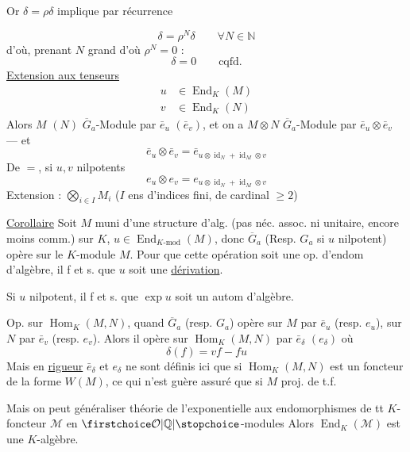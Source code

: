 Or $\delta=\rho\delta$ implique par récurrence

\[
\delta=\rho^N\delta\qquad\forall N\in\mathbb{N}
\]
d'où, prenant $N$ grand d'où $\rho^N=0$ :
\[
\delta=0\qquad\text{cqfd.}
\]
\uline{Extension aux tenseurs}
\[
\begin{aligned}
u&\in\operatorname{End}_K(M)\\
v&\in\operatorname{End}_K(N)
\end{aligned}
\]
Alors $M$ $(N)$ $\overline G_a$-Module par $\bar e_u$ $(\bar e_v)$, et on a $M\otimes N$ $\overline G_a$-Module par $\bar e_u\otimes\bar e_v$ --- et
\[
\bar e_u\otimes\bar e_v=\bar e_{u\otimes\operatorname{id}_N+\operatorname{id}_M\otimes v}
\]
De $=$, si $u,v$ nilpotents
\[
e_u\otimes e_v=e_{u\otimes\operatorname{id}_N+\operatorname{id}_M\otimes v}
\]
Extension : $\displaystyle\bigotimes_{i\in I}M_i$ ($I$ ens d'indices fini, de cardinal $\geq2$)

\uline{Corollaire} Soit $M$ muni d'une structure d'alg. (pas néc. assoc. ni unitaire, encore moins comm.) sur $K$, $u\in\operatorname{End}_{K\text{-mod}}(M)$, donc $\overline G_a$ (Resp. $G_a$ si $u$ nilpotent) opère sur le $K$-module $M$. Pour que cette opération soit une op. d'endom d'algèbre, il f et s. que $u$ soit une \uline{dérivation}.

Si $u$ nilpotent, il f et s. que $\exp u$ soit un autom d'algèbre.

Op. sur $\operatorname{Hom}_K(M,N)$, quand $\overline G_a$ (resp. $G_a$) opère sur $M$ par $\bar e_u$ (resp. $e_u$), sur $N$ par $\bar e_v$ (resp. $e_v$). Alors il opère sur $\operatorname{Hom}_K(M,N)$ par $\bar e_\delta$ $(e_\delta)$ où
\[
\delta(f)=vf-fu
\]
Mais en  \uline{rigueur} $\bar e_\delta$ et $e_\delta$ ne sont définis ici que si $\operatorname{Hom}_K(M,N)$ est  un foncteur de la forme $W(M)$, ce qui n'est guère assuré que si $M$ proj. de t.f.

Mais on peut généraliser théorie de l'exponentielle aux  endomorphismes de tt $K$-foncteur $\mathcal M$ en $\unsure{\mathcal O|\mathbb{Q}}$-modules
Alors $\operatorname{End}_K(\mathcal M)$ est une $K$-algèbre.


